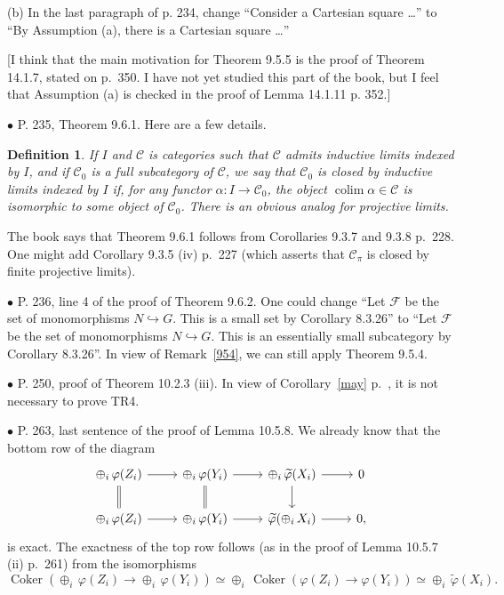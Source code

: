 \documentclass[12pt]{article}
\newtheorem{df}[thm]{Definition}%
\theoremstyle{remark}%
\newcommand{\bu}{\bullet}
\newcommand{\n}{\noindent}
\newcommand{\cc}{\mathcal}
\newcommand{\C}{\mathcal C}
\newcommand{\incl}{\hookrightarrow}
\newcommand{\p}{\varphi}
\DeclareMathOperator*{\co}{colim}
\DeclareMathOperator{\Coker}{Coker}
\begin{document}
\n(b) In the last paragraph of p. 234, change ``Consider a Cartesian square \dots'' to ``By Assumption (a), there is a Cartesian square \dots'' 

[I think that the main motivation for Theorem 9.5.5 is the proof of Theorem 14.1.7, stated on p.~350. I have not yet studied this part of the book, but I feel that Assumption (a) is checked in the proof of Lemma 14.1.11 p. 352.] 


\n$\bu$ P. 235, Theorem 9.6.1. Here are a few details. 
%
\begin{df}\label{cb}
If $I$ and $\C$ is categories such that $\C$ admits inductive limits indexed by $I$, and if $\C_0$ is a full subcategory of $\C$, we say that $\C_0$ is {\em closed by inductive limits indexed by} $I$ if, for any functor $\alpha:I\to\C_0$, the object $\co\alpha\in\C$ is isomorphic to some object of $\C_0$. There is an obvious analog for projective limits.
\end{df}

The book says that Theorem 9.6.1 follows from Corollaries 9.3.7 and 9.3.8 p.~228. One might add Corollary 9.3.5 (iv) p.~227 (which asserts that $\C_\pi$ is closed by finite projective limits). 


\n$\bu$ P. 236, line 4 of the proof of Theorem 9.6.2. One could change ``Let $\cc F$ be the set of monomorphisms $N\incl G$. This is a small set by Corollary 8.3.26'' to ``Let $\cc F$ be the set of monomorphisms $N\incl G$. This is an essentially small subcategory by Corollary 8.3.26''. In view of Remark~\ref{954}, we can still apply Theorem 9.5.4. 


\n$\bu$ P. 250, proof of Theorem 10.2.3 (iii). In view of Corollary~\ref{may} p.~\pageref{may}, it is not necessary to prove TR4. 


\n$\bu$ P. 263, last sentence of the proof of Lemma 10.5.8. We already know that the bottom row of the diagram 
$$
\begin{tikzcd}
\oplus_i\,\p(Z_i)\ar[equal]{d}\ar{r}&\oplus_i\,\p(Y_i)\ar[equal]{d}\ar{r}&\oplus_i\,\widetilde\p(X_i)\ar{d}\ar{r}&0\\ 
\oplus_i\,\p(Z_i)\ar{r}&\oplus_i\,\p(Y_i)\ar{r}&\widetilde\p(\oplus_i\,X_i)\ar{r}&0,
\end{tikzcd}
$$ 
is exact. The exactness of the top row follows (as in the proof of Lemma 10.5.7 (ii) p.~261) from the isomorphisms 
$$
\Coker(\oplus_i\,\p(Z_i)\to\oplus_i\,\p(Y_i))\simeq\oplus_i\,\Coker(\p(Z_i)\to\p(Y_i))\simeq\oplus_i\,\widetilde\p(X_i).
$$ 
\end{document}
